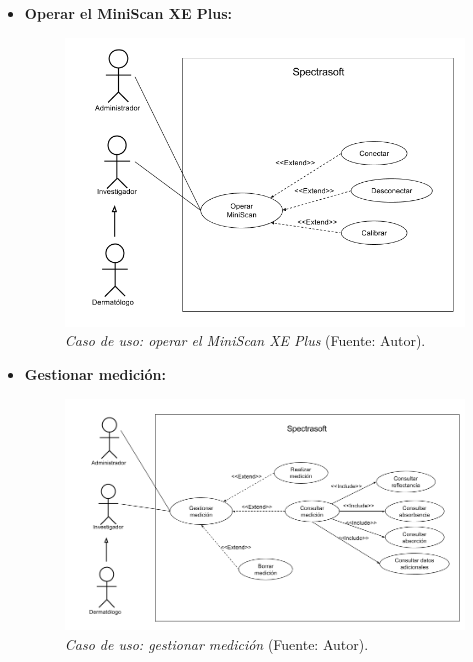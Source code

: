  \begin{itemize}
 	
 	\item \textbf{Operar el MiniScan XE Plus:}
 	
 		\begin{figure}[H]
		\centering
		\includegraphics[scale=0.4]{img/cu-manejar-miniscan.png}
			\caption[Caso de uso: operar el MiniScan XE Plus]{\textit{ Caso de uso: operar el MiniScan XE Plus} (Fuente: Autor).}
	\end{figure}
	
	 	\item \textbf{Gestionar medici\'{o}n:}
 	
 		\begin{figure}[H]
		\centering
		\includegraphics[scale=0.4]{img/cu-gestion-medicion.png}
			\caption[Caso de uso: gestionar medici\'{o}n]{\textit{ Caso de uso: gestionar medici\'{o}n} (Fuente: Autor).}
	\end{figure}


\end{itemize}

